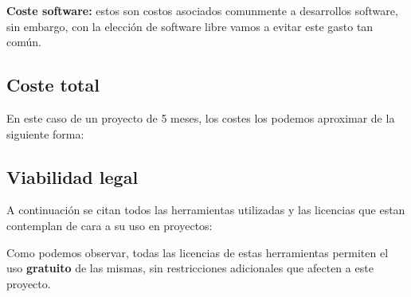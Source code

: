 \textbf{Coste software:} estos son costos asociados comunmente a desarrollos software, sin embargo, con la elección de software libre vamos a evitar este gasto tan común.

\subsection{Coste total}
En este caso de un proyecto de 5 meses, los costes los podemos aproximar de la siguiente forma:

\subsection{Viabilidad legal}
A continuación se citan todos las herramientas utilizadas y las licencias que estan contemplan de cara a su uso en proyectos:


Como podemos observar, todas las licencias de estas herramientas permiten el uso \textbf{gratuito} de las mismas, sin restricciones adicionales que afecten a este proyecto.